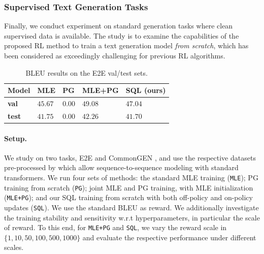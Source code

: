 \subsubsection{Supervised Text Generation Tasks}
\label{appendix-subsec:standard-tasks}

Finally, we conduct experiment on standard generation tasks where clean supervised data is available. The study is to examine the capabilities of the proposed RL method to train a text generation model \emph{from scratch}, which has been considered as exceedingly challenging for previous RL algorithms.



\begin{table}
\centering
\small
\begin{tabular}{@{}l|llll@{}}
\toprule
\textbf{Model} & MLE & PG & MLE+PG & SQL (ours) \\
\midrule
\textbf{val} & $45.67$ & $0.00$ & $49.08$ & $47.04$ \\
\textbf{test} & $41.75$ & $0.00$ & $42.26$ & $41.70$ \\
\bottomrule
\end{tabular}
\vspace{-5pt}
\caption{BLEU results on the E2E val/test sets.}
\label{table:e2e-results}
\end{table}


\paragraph{Setup.}
We study on two tasks, E2E \citep{novikova2017e2e} and CommonGEN \citep{lin-etal-2020-commongen}, and use the respective datasets pre-processed by \citep{gehrmann2021gem} which allow sequence-to-sequence modeling with standard transformers.
We run four sets of methods:
the standard MLE training (\texttt{MLE}); PG training from scratch (\texttt{PG}); joint MLE and PG training, with MLE initialization (\texttt{MLE+PG}); and our SQL training from scratch with both off-policy and on-policy updates (\texttt{SQL}). We use the standard BLEU as reward.
We additionally investigate the training stability and sensitivity w.r.t hyperparameters, in particular the scale of reward. To this end, for \texttt{MLE+PG} and \texttt{SQL}, we vary the reward scale in $\{1, 10, 50, 100, 500, 1000\}$ and evaluate the respective performance under different scales.


